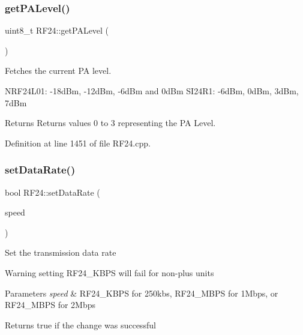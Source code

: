 \mbox{\label{classRF24_af7c4dcd84466168c5816382ceb366067}} 
\subsubsection{\texorpdfstring{get\+P\+A\+Level()}{getPALevel()}}
{\footnotesize\ttfamily uint8\+\_\+t R\+F24\+::get\+P\+A\+Level (\begin{DoxyParamCaption}\item[{void}]{ }\end{DoxyParamCaption})}

Fetches the current PA level.

N\+R\+F24\+L01\+: -\/18d\+Bm, -\/12d\+Bm, -\/6d\+Bm and 0d\+Bm S\+I24\+R1\+: -\/6d\+Bm, 0d\+Bm, 3d\+Bm, 7d\+Bm

\begin{DoxyReturn}{Returns}
Returns values 0 to 3 representing the PA Level. 
\end{DoxyReturn}


Definition at line 1451 of file R\+F24.\+cpp.

\mbox{\label{classRF24_aeb9920e7a95699748b003c4a839b0814}} 
\subsubsection{\texorpdfstring{set\+Data\+Rate()}{setDataRate()}}
{\footnotesize\ttfamily bool R\+F24\+::set\+Data\+Rate (\begin{DoxyParamCaption}\item[{\hyperlink{RF24_8h_a82745de4aa1251b7561564b3ed1d6522}{rf24\+\_\+datarate\+\_\+e}}]{speed }\end{DoxyParamCaption})}

Set the transmission data rate

\begin{DoxyWarning}{Warning}
setting R\+F24\+\_\+K\+B\+PS will fail for non-\/plus units
\end{DoxyWarning}

\begin{DoxyParams}{Parameters}
{\em speed} & R\+F24\+\_\+K\+B\+PS for 250kbs, R\+F24\+\_\+M\+B\+PS for 1\+Mbps, or R\+F24\+\_\+M\+B\+PS for 2\+Mbps \\
\hline
\end{DoxyParams}
\begin{DoxyReturn}{Returns}
true if the change was successful 
\end{DoxyReturn}


